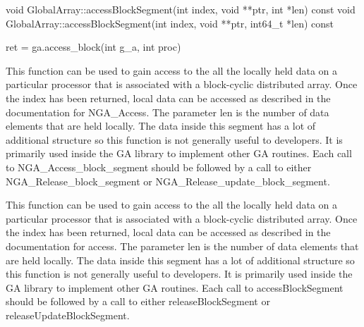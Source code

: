 \documentclass[12pt]{article}
\begin{document}
\begin{cxxapi}
\begin{cxxcode}
void GlobalArray::accessBlockSegment(int index, void **ptr,
                                     int *len) const
void GlobalArray::accessBlockSegment(int index, void **ptr,
                                     int64_t *len) const
\end{cxxcode}
\begin{funcargs}
\end{funcargs}
\end{cxxapi}

\begin{pyapi}
\begin{pycode}
ret = ga.access_block(int g_a, int proc)
\end{pycode}
\begin{funcargs}
\end{funcargs}
\end{pyapi}

\local

\begin{cdesc}
This function can be used to gain access to the all the locally held data on a
particular processor that is associated with a block-cyclic distributed array.
Once the index has been returned, local data can be accessed as described in
the documentation for NGA_Access. The parameter len is the number of data
elements that are held locally. The data inside this segment has a lot of
additional structure so this function is not generally useful to developers. It
is primarily used inside the GA library to implement other GA routines. Each
call to NGA_Access_block_segment should be followed by a call to either
NGA_Release_block_segment or NGA_Release_update_block_segment.
\end{cdesc}

\begin{cxxdesc}
This function can be used to gain access to the all the locally held data on a
particular processor that is associated with a block-cyclic distributed array.
Once the index has been returned, local data can be accessed as described in
the documentation for access. The parameter len is the number of data
elements that are held locally. The data inside this segment has a lot of
additional structure so this function is not generally useful to developers. It
is primarily used inside the GA library to implement other GA routines. Each
call to accessBlockSegment should be followed by a call to either
releaseBlockSegment or releaseUpdateBlockSegment.
\end{cxxdesc}
\end{document}
